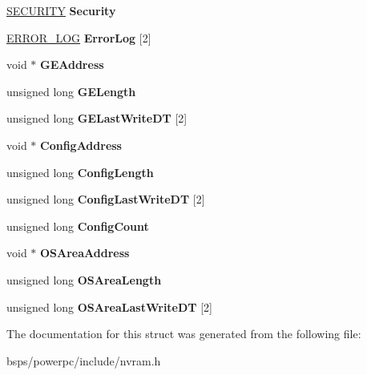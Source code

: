 \begin{DoxyCompactItemize}
\item 
\mbox{\label{struct__HEADER_a9524ad27f3c21814a20630ced007a923}} 
\mbox{\hyperlink{struct__SECURITY}{S\+E\+C\+U\+R\+I\+TY}} {\bfseries Security}
\item 
\mbox{\label{struct__HEADER_a6e5dd642873d0891a64544d159fe6723}} 
\mbox{\hyperlink{struct__ERROR__LOG}{E\+R\+R\+O\+R\+\_\+\+L\+OG}} {\bfseries Error\+Log} \mbox{[}2\mbox{]}
\item 
\mbox{\label{struct__HEADER_ad07d0542701ceec1f0f137c5e69fd4e0}} 
void $\ast$ {\bfseries G\+E\+Address}
\item 
\mbox{\label{struct__HEADER_ac5fb6bf38cc8498dee88d872d1f46611}} 
unsigned long {\bfseries G\+E\+Length}
\item 
\mbox{\label{struct__HEADER_abbc230d4193ba5fa01f08f67dd3ef459}} 
unsigned long {\bfseries G\+E\+Last\+Write\+DT} \mbox{[}2\mbox{]}
\item 
\mbox{\label{struct__HEADER_a1fe53ea7064234946f9c75736c615b35}} 
void $\ast$ {\bfseries Config\+Address}
\item 
\mbox{\label{struct__HEADER_a630c385a722f1d339163345ced4213f3}} 
unsigned long {\bfseries Config\+Length}
\item 
\mbox{\label{struct__HEADER_a041c37b89e2f9c6b2b463ab23ca6b2bb}} 
unsigned long {\bfseries Config\+Last\+Write\+DT} \mbox{[}2\mbox{]}
\item 
\mbox{\label{struct__HEADER_ad121be0ebf75d8a006c459f81e13918a}} 
unsigned long {\bfseries Config\+Count}
\item 
\mbox{\label{struct__HEADER_acb4864315ba3a608054eecb082e502b7}} 
void $\ast$ {\bfseries O\+S\+Area\+Address}
\item 
\mbox{\label{struct__HEADER_ab1c0604ffd60a85c4259cb18b2887cf5}} 
unsigned long {\bfseries O\+S\+Area\+Length}
\item 
\mbox{\label{struct__HEADER_aa370684a8361af61ed2a2936d0f699d1}} 
unsigned long {\bfseries O\+S\+Area\+Last\+Write\+DT} \mbox{[}2\mbox{]}
\end{DoxyCompactItemize}


The documentation for this struct was generated from the following file\+:\begin{DoxyCompactItemize}
\item 
bsps/powerpc/include/nvram.\+h\end{DoxyCompactItemize}
